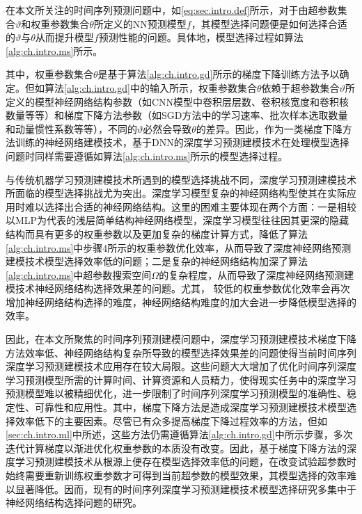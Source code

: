 在本文所关注的时间序列预测问题中，如\autoref{eq:sec.intro.def}所示，对于由超参数集合\(\vartheta\)和权重参数集合\(\theta\)所定义的NN预测模型\(f\)，其模型选择问题便是如何选择合适的\(\vartheta\)与\(\theta\)从而提升模型\(f\)预测性能的问题。具体地，模型选择过程如算法\ref{alg:ch.intro.ms}所示。

其中，权重参数集合\(\theta\)是基于算法\ref{alg:ch.intro.gd}所示的梯度下降训练方法予以确定。但如算法\ref{alg:ch.intro.gd}中的输入所示，权重参数集合\(\theta\)依赖于超参数集合\(\vartheta\)所定义的模型神经网络结构参数（如CNN模型中卷积层层数、卷积核宽度和卷积核数量等等）和梯度下降方法参数（如SGD方法中的学习速率、批次样本选取数量和动量惯性系数等等），不同的\(\vartheta\)必然会导致\(\theta\)的差异。因此，作为一类梯度下降方法训练的神经网络建模技术，基于DNN的深度学习预测建模技术在处理模型选择问题时同样需要遵循如算法\ref{alg:ch.intro.ms}所示的模型选择过程。


与传统机器学习预测建模技术所遇到的模型选择挑战不同，深度学习预测建模技术所面临的模型选择挑战尤为突出。深度学习模型复杂的神经网络构型使其在实际应用时难以选择出合适的神经网络结构\cite{miikkulainenChapter2019}。这里的困难主要体现在两个方面：一是相较以MLP为代表的浅层简单结构神经网络模型，深度学习模型往往因其更深的隐藏结构而具有更多的权重参数以及更加复杂的梯度计算方式，降低了算法\ref{alg:ch.intro.ms}中步骤4所示的权重参数优化效率\cite{glorotUnderstanding2010,pascanuDifficulty2013}，从而导致了深度神经网络预测建模技术模型选择效率低的问题；二是复杂的神经网络结构加深了算法\ref{alg:ch.intro.ms}中超参数搜索空间\(\Omega\)的复杂程度，从而导致了深度神经网络预测建模技术神经网络结构选择效果差的问题。尤其，
较低的权重参数优化效率会再次增加神经网络结构选择的难度，神经网络结构难度的加大会进一步降低模型选择的效率。


因此，在本文所聚焦的时间序列预测建模问题中，深度学习预测建模技术梯度下降方法效率低、神经网络结构复杂所导致的模型选择效果差的问题使得当前时间序列深度学习预测建模技术应用存在较大局限。这些问题大大增加了优化时间序列深度学习预测模型所需的计算时间、计算资源和人员精力，使得现实任务中的深度学习预测模型难以被精细优化，进一步限制了时间序列深度学习预测模型的准确性、稳定性、可靠性和应用性。其中，梯度下降方法是造成深度学习预测建模技术模型选择效率低下的主要因素。尽管已有众多提高梯度下降过程效率的方法\cite{bottouStochastic2012,duchiAdaptive2011,liuImproved2020}，但如\autoref{sec:ch.intro.ml}中所述，这些方法仍需遵循算法\ref{alg:ch.intro.gd}中所示步骤，多次迭代计算梯度以渐进优化权重参数的本质没有改变。因此，基于梯度下降方法的深度学习预测建模技术从根源上便存在模型选择效率低的问题，在改变试验超参数时始终需要重新训练权重参数才可得到当前超参数的模型效果，其模型选择的效率难以显著降低。因而，现有的时间序列深度学习预测建模技术模型选择研究多集中于神经网络结构选择问题的研究。


